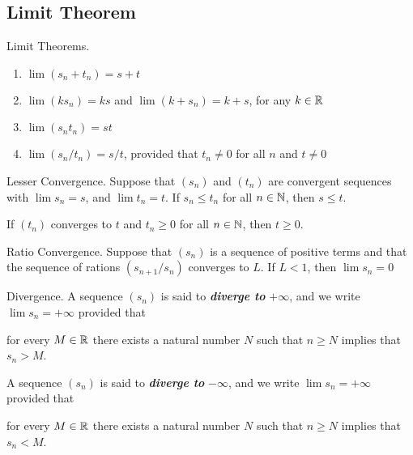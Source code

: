 \documentclass[12pt]{article}
\begin{document}
\subsection{Limit Theorem}
\label{sec:org456a7bd}
\begin{definition}{Limit Theorems.}
  \begin{enumerate}
    \item $\lim{(s_n + t_n)} = s + t$
    \item $\lim{(ks_n)} = ks$ and $\lim{(k + s_n)} = k + s$, for any $k \in
      \mathbb{R}$
    \item $\lim{(s_n t_n)} = st$
    \item $\lim{(s_n/t_n)} = s/t$, provided that $t_n \ne 0$ for all $n$ and $t
      \ne 0$
  \end{enumerate}
\end{definition}

\begin{definition}{Lesser Convergence.}
  Suppose that $(s_n)$ and $(t_n)$ are convergent sequences with $\lim{s_n} =
  s$, and $\lim{t_n} = t$. If $s_n \le t_n$ for all $n \in \mathbb{N}$, then $s
  \le t$.
\end{definition}

\begin{corollary}
  If $(t_n)$ converges to $t$ and $t_n \ge 0$ for all $n \in \mathbb{N}$, then $t
  \ge 0$.
\end{corollary}

\begin{definition}{Ratio Convergence.}
  Suppose that $(s_n)$ is a sequence of positive terms and that the sequence of
  rations $(s_{n+1} / s_n)$ converges to $L$. If $L < 1$, then $\lim{s_n} = 0$
\end{definition}

\begin{definition}{Divergence.}
  A sequence $(s_n)$ is said to \textit{\textbf{diverge to}} $+\infty$, and we
  write $\lim{s_n} = +\infty$ provided that
  \begin{center}
    for every $M \in \mathbb{R}$ there exists a natural number $N$ such that $n \ge
    N$ implies that $s_n > M$.
  \end{center}

  A sequence $(s_n)$ is said to \textit{\textbf{diverge to}} $-\infty$, and we
  write $\lim{s_n} = +\infty$ provided that
  \begin{center}
    for every $M \in \mathbb{R}$ there exists a natural number $N$ such that $n \ge
    N$ implies that $s_n < M$.
  \end{center}
\end{definition}
\end{document}
